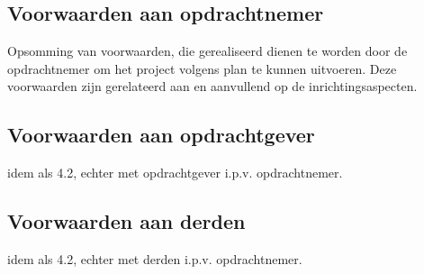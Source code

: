 \subsection{Voorwaarden aan opdrachtnemer}
Opsomming van voorwaarden, die gerealiseerd dienen te worden door de opdrachtnemer om het project volgens plan te kunnen uitvoeren.
Deze voorwaarden zijn gerelateerd aan en aanvullend op de inrichtingsaspecten.

\subsection{Voorwaarden aan opdrachtgever}

idem als 4.2, echter met opdrachtgever i.p.v. opdrachtnemer.

\subsection{Voorwaarden aan derden}

idem als 4.2, echter met derden i.p.v. opdrachtnemer.

